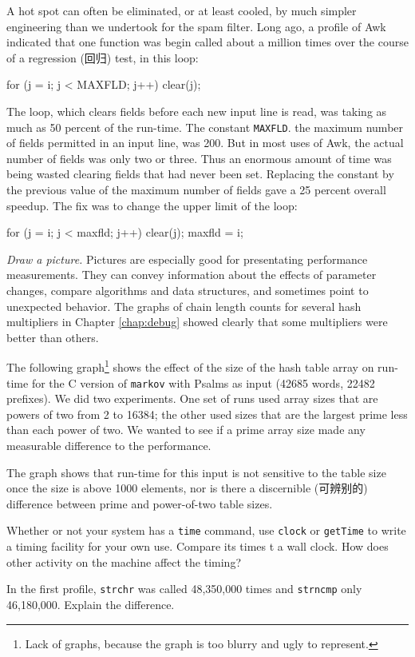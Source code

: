 A hot spot can often be eliminated, or at least cooled, by much simpler
engineering than we undertook for the spam filter. Long ago, a profile of
Awk indicated that one function was begin called about a million times over
the course of a regression (回归) test, in this loop:
\begin{badcode}
    for (j = i; j < MAXFLD; j++)
        clear(j);
\end{badcode}
The loop, which clears fields before each new input line is read, was
taking as much as 50 percent of the run-time. The constant \verb'MAXFLD'.
the maximum number of fields permitted in an input line, was 200. But in
most uses of Awk, the actual number of fields was only two or three. Thus
an enormous amount of time was being wasted clearing fields that had never
been set. Replacing the constant by the previous value of the maximum
number of fields gave a 25 percent overall speedup. The fix was to change
the upper limit of the loop:
\begin{wellcode}
    for (j = i; j < maxfld; j++)
        clear(j);
    maxfld = i;
\end{wellcode}

\emph{Draw a picture.} Pictures are especially good for presentating
performance measurements. They can convey information about the effects of
parameter changes, compare algorithms and data structures, and sometimes
point to unexpected behavior. The graphs of chain length counts for several
hash multipliers in Chapter \ref{chap:debug} showed clearly  that some
multipliers were better than others.

The following graph\footnote{Lack of graphs, because the graph is too
    blurry and ugly to represent.} shows the effect of the size of the hash
table array on run-time for the C version of \verb'markov' with Psalms as
input (42685 words, 22482 prefixes). We did two experiments. One set of
runs used array sizes that are powers of two from 2 to 16384; the other
used sizes that are the largest prime less than each power of two. We
wanted to see if a prime array size made any measurable difference to the
performance.

The graph shows that run-time for this input is not sensitive to the table
size once the size is above 1000 elements, nor is there a discernible
(可辨别的) difference between prime and power-of-two table sizes.

\begin{exercise}
    Whether or not your system has a \verb'time' command, use \verb'clock'
    or \verb'getTime' to write a timing facility for your own use. Compare
    its times t a wall clock. How does other activity on the machine affect
    the timing?
\end{exercise}
\begin{exercise}
    In the first profile, \verb'strchr' was called 48,350,000 times and
    \verb'strncmp' only 46,180,000. Explain the difference.
\end{exercise}
